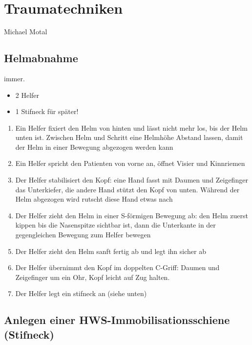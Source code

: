 \section{Traumatechniken}
Michael Motal

\subsection{Helmabnahme}

immer.


\begin{itemize}
\item 2 Helfer
\item 1 Stifneck f\"ur sp\"ater!
\end{itemize}


\begin{enumerate}
    \item Ein Helfer fixiert den Helm von hinten und l\"asst nicht mehr los,
    bis der Helm unten ist. Zwischen Helm und Schritt eine Helmh\"ohe
    Abstand lassen, damit der Helm in einer Bewegung abgezogen werden kann
    \item Ein Helfer spricht den Patienten von vorne an, \"offnet Visier und
    Kinnriemen
    \item Der  Helfer stabilisiert den Kopf: eine Hand fasst mit
    Daumen und Zeigefinger das Unterkiefer, die andere Hand st\"utzt den
    Kopf von unten. W\"ahrend der Helm abgezogen wird rutscht diese Hand
    etwas nach
    \item Der  Helfer zieht den Helm in einer S-f\"ormigen Bewegung
    ab: den Helm zuerst kippen bis die Nasenspitze sichtbar ist, dann die
    Unterkante in der gegengleichen Bewegung zum Helfer bewegen
    \item Der  Helfer zieht den Helm sanft fertig ab und legt ihn
    sicher ab
    \item Der  Helfer \"ubernimmt den Kopf im doppelten C-Griff:
    Daumen und Zeigefinger um ein Ohr, Kopf leicht auf Zug halten.
    \item Der  Helfer legt ein stifneck an (siehe unten)
\end{enumerate}


\subsection{Anlegen einer
HWS-Immobilisationsschiene (Stifneck\texttrademark)}

